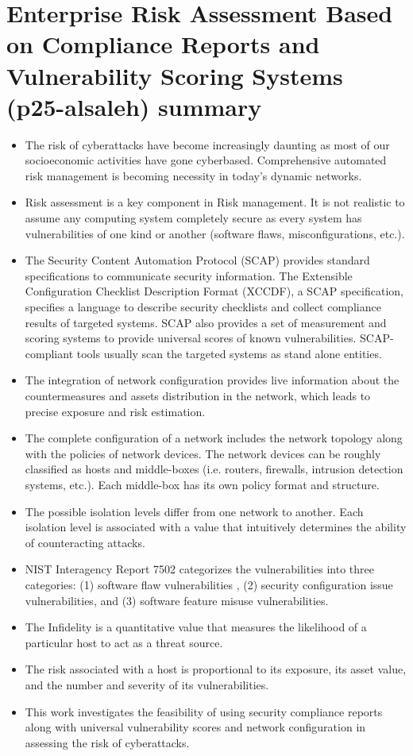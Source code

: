 \documentclass[14pt]{article}
\begin{document}
	\section{Enterprise Risk Assessment Based on Compliance Reports and Vulnerability Scoring Systems (p25-alsaleh) summary}
	\begin{itemize}
	\item The risk of cyberattacks have become increasingly daunting as most of our socioeconomic activities have gone cyberbased. Comprehensive automated risk management is becoming necessity in today’s dynamic networks.
	\item Risk assessment is a key component in Risk management. It is not realistic to assume any computing system completely secure as every system has vulnerabilities of one kind or another (software ﬂaws, misconﬁgurations, etc.).
	\item The Security Content Automation Protocol (SCAP) provides standard speciﬁcations to communicate security information. The Extensible Conﬁguration Checklist Description Format (XCCDF), a SCAP speciﬁcation, speciﬁes a language to describe security checklists and collect compliance results of targeted systems. SCAP also provides a set of measurement and scoring systems to provide universal scores of known vulnerabilities. SCAP-compliant tools usually scan the targeted systems as stand alone entities.
	\item The integration of network conﬁguration provides live information about the countermeasures and assets distribution in the network, which leads to precise exposure and risk estimation. 
	\item The complete conﬁguration of a network includes the network topology along with the policies of network devices. The network devices can be roughly classiﬁed as hosts and middle-boxes (i.e. routers, ﬁrewalls, intrusion detection systems, etc.). Each middle-box has its own policy format and structure. 
	\item The possible isolation levels diﬀer from one network to another. Each isolation level is associated with a value that intuitively determines the ability of counteracting attacks. 
	\item NIST Interagency Report 7502 categorizes the vulnerabilities into three categories: (1) software ﬂaw vulnerabilities , (2) security conﬁguration issue vulnerabilities, and (3) software feature misuse vulnerabilities.
	\item The Inﬁdelity is a quantitative value that measures the likelihood of a particular host to act as a threat source.
	\item The risk associated with a host is proportional to its exposure, its asset value, and the number and severity of its vulnerabilities.
	\item This work investigates the feasibility of using security compliance reports along with universal vulnerability scores and network conﬁguration in assessing the risk of cyberattacks. 
	\end{itemize}
	
\end{document}
